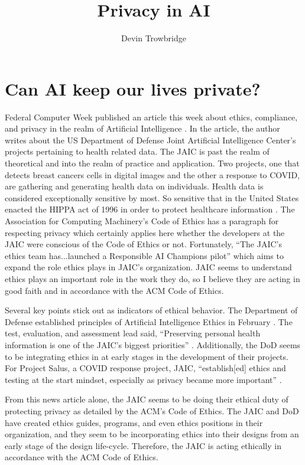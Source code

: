\documentclass[format=sigconf]{acmart}
\title{Privacy in AI}
\author{Devin Trowbridge}
\affiliation{%
  \department{Computer Science and Software Engineering}
  \institution{Auburn University }
  \email{dkt0003@auburn.edu}
  \city{Huntsville}
  \state{Alabama}
  \country{United States}}
\begin{document}
\maketitle

\section{Can AI keep our lives private?}

Federal Computer Week published an article this week about ethics, compliance, and privacy in the realm of Artificial Intelligence \cite{fcw}. In the article, the author writes about the US Department of Defense Joint Artificial Intelligence Center's projects pertaining to health related data. The JAIC is past the realm of theoretical and into the realm of practice and application. Two projects, one that detects breast cancers cells in digital images and the other a response to COVID, are gathering and generating health data on individuals. Health data is considered exceptionally sensitive by most. So sensitive that in the United States enacted the HIPPA act of 1996 in order to protect healthcare information \cite{hippa}. The Association for Computing Machinery's Code of Ethics has a paragraph for respecting privacy which certainly applies here whether the developers at the JAIC were conscious of the Code of Ethics or not. Fortunately, ``The JAIC's ethics team has...launched a Responsible AI Champions pilot'' \cite{fcw} which aims to expand the role ethics plays in JAIC's organization. JAIC seems to understand ethics plays an important role in the work they do, so I believe they are acting in good faith and in accordance with the ACM Code of Ethics.

Several key points stick out as indicators of ethical behavior. The Department of Defense established principles of Artificial Intelligence Ethics in February \cite{dod}. The test, evaluation, and assessment lead said, ``Preserving personal health information is one of the JAIC's biggest priorities'' \cite{fcw}. Additionally, the DoD seems to be integrating ethics in at early stages in the development of their projects. For Project Salus, a COVID response project, JAIC, ``establish[ed] ethics and testing at the start mindset, especially as privacy became more important'' \cite{fcw}.
  
From this news article alone, the JAIC seems to be doing their ethical duty of protecting privacy as detailed by the ACM's Code of Ethics. The JAIC and DoD have created ethics guides, programs, and even ethics positions in their organization, and they seem to be incorporating ethics into their designs from an early stage of the design life-cycle. Therefore, the JAIC is acting ethically in accordance with the ACM Code of Ethics.

\medskip



\end{document}
